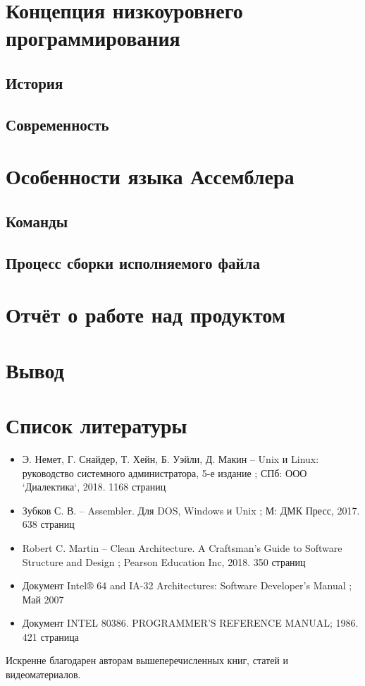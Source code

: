 \documentclass[a4paper]{article}
\begin{document}
\section{Концепция низкоуровнего программирования}
	\subsection{История}
	\subsection{Современность}
\section{Особенности языка Ассемблера}
	\subsection{Команды}
	\subsection{Процесс сборки исполняемого файла}
\section{Отчёт о работе над продуктом}
\pagebreak
\section{Вывод}
\pagebreak
\section{Список литературы}
	\begin{itemize}
		\item Э. Немет, Г. Снайдер, Т. Хейн, Б. Уэйли, Д. Макин --
			\flqq{}Unix и Linux: руководство системного
			администратора, 5-е издание \frqq{}; СПб: ООО
			`Диалектика`, 2018. 1168 страниц
		\item Зубков С. В. -- \flqq{}Assembler. Для DOS, Windows и
			Unix \frqq{}; М: ДМК Пресс, 2017. 638 страниц
		\item Robert C. Martin -- \flqq{}Clean Architecture. A Craftsman's
			Guide to Software Structure and Design \frqq{}; Pearson
			Education Inc, 2018. 350 страниц
		\item Документ \flqq{}Intel® 64 and IA-32 Architectures:
			Software Developer’s Manual \frqq{}; Май 2007
		\item Документ \flqq{} INTEL 80386. PROGRAMMER'S REFERENCE
		MANUAL\frqq{}; 1986. 421 страница
	\end{itemize}
	Искренне благодарен авторам вышеперечисленных книг, статей и
	видеоматериалов.
\end{document}
